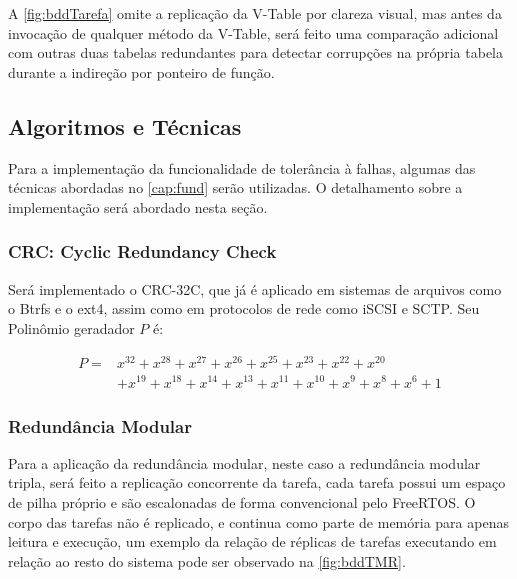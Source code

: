 A \autoref{fig:bddTarefa} omite a replicação da V-Table por clareza visual, mas antes da invocação de qualquer método da V-Table, será feito uma comparação adicional com outras duas tabelas redundantes para detectar corrupções na própria tabela durante a indireção por ponteiro de função.

\subsection{Algoritmos e Técnicas} \label{subsec:algoritmos}

Para a implementação da funcionalidade de tolerância à falhas, algumas das técnicas abordadas no \autoref{cap:fund} serão utilizadas. O detalhamento sobre a implementação será abordado nesta seção.

\subsubsection{CRC: Cyclic Redundancy Check}

Será implementado o CRC-32C, que já é aplicado em sistemas de arquivos como o Btrfs e o ext4, assim como em protocolos de rede como iSCSI e SCTP. Seu Polinômio geradador $P$ é:

\begin{equation}
    \begin{split}
        P = & x^{32} + x^{28} + x^{27} + x^{26} + x^{25} + x^{23} + x^{22} + x^{20} \\
            & + x^{19} + x^{18} + x^{14} + x^{13} + x^{11} + x^{10} + x^{9} + x^{8} + x^{6} + 1
    \end{split}
\end{equation}


\subsubsection{Redundância Modular}

Para a aplicação da redundância modular, neste caso a redundância modular tripla, será feito a replicação concorrente da tarefa, cada tarefa possui um espaço de pilha próprio e são escalonadas de forma convencional pelo FreeRTOS. O corpo das tarefas não é replicado, e continua como parte de memória para apenas leitura e execução, um exemplo da relação de réplicas de tarefas executando em relação ao resto do sistema pode ser observado na \autoref{fig:bddTMR}.

